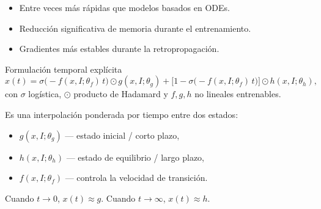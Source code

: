 \documentclass{claudeeditorial}
\begin{document}
\bigskip

\begin{ClaudeTip}
\begin{itemize}[leftmargin=1.2em,nosep]
\item Entre  veces más rápidas que modelos basados en ODEs.
\item Reducción significativa de memoria durante el entrenamiento.
\item Gradientes más estables durante la retropropagación.
\end{itemize}
\end{ClaudeTip}


\begin{ClaudeCard}{Formulación temporal explícita}
\[
  x(t) = \sigma\bigl(-f(x,I;\theta_f)\,t\bigr) \odot g(x,I;\theta_g)
       + \bigl[1 - \sigma\bigl(-f(x,I;\theta_f)\,t\bigr)\bigr] \odot h(x,I;\theta_h),
\]
con $\sigma$ logística, $\odot$ producto de Hadamard y $f,g,h$ no lineales entrenables.
\end{ClaudeCard}

\begin{ClaudeInfo}[Interpretación]
Es una interpolación ponderada por tiempo entre dos estados:
\begin{itemize}[leftmargin=1.2em,nosep]
\item $g(x,I;\theta_g)$ — estado inicial / corto plazo,
\item $h(x,I;\theta_h)$ — estado de equilibrio / largo plazo,
\item $f(x,I;\theta_f)$ — controla la velocidad de transición.
\end{itemize}
Cuando $t\to 0$, $x(t)\approx g$. Cuando $t\to\infty$, $x(t)\approx h$.
\end{ClaudeInfo}

\end{document}
